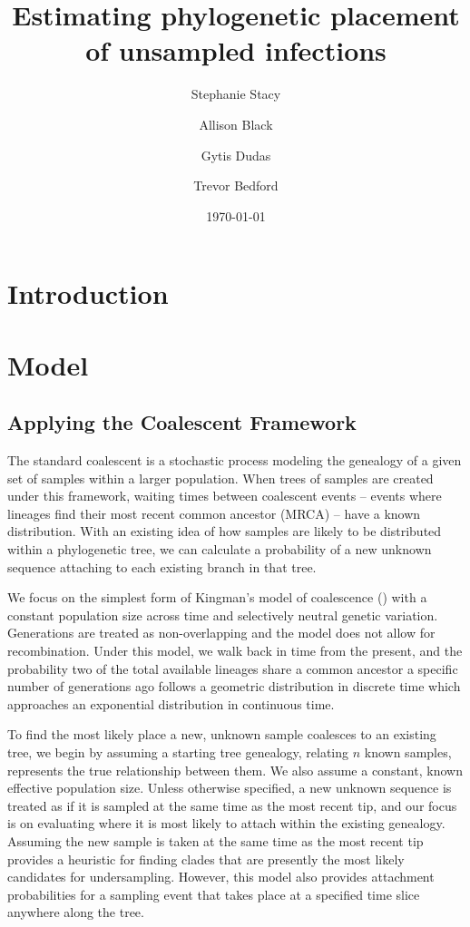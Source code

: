 \documentclass[11pt,oneside,letterpaper]{article}
\title{\vspace{1.0cm} \LARGE \bf Estimating phylogenetic placement of unsampled infections}
\author[1]{Stephanie Stacy}
\author[1,2]{Allison Black}
\author[1]{Gytis Dudas}
\author[1]{Trevor Bedford}
\affil[1]{Vaccine and Infectious Disease Division, Fred Hutchinson Cancer Research Center, Seattle, WA, USA}
\affil[2]{Department of Epidemiology, University of Washington, Seattle, WA, USA}
\date{\today}
\newcommand\tab[1][1cm]{\hspace*{#1}}
\begin{document}
\maketitle

\begin{abstract}


\end{abstract}

\pagebreak

\section*{Introduction}


\section*{Model}
\subsection*{Applying the Coalescent Framework}
\tab The standard coalescent is a stochastic process modeling the genealogy of a given set of samples within a larger population. When trees of samples are created under this framework, waiting times between coalescent events -- events where lineages find their most recent common ancestor (MRCA) -- have a known distribution. With an existing idea of how samples are likely to be distributed within a phylogenetic tree, we can calculate a probability of a new unknown sequence attaching to each existing branch in that tree. 

\tab We focus on the simplest form of Kingman's model of coalescence () with a constant population size across time and selectively neutral genetic variation. Generations are treated as non-overlapping and the model does not allow for recombination. Under this model, we walk back in time from the present, and the probability two of the total available lineages share a common ancestor a specific number of generations ago follows a geometric distribution in discrete time which approaches an exponential distribution in continuous time. 

\tab To find the most likely place a new, unknown sample coalesces to an existing tree, we begin by assuming a starting tree genealogy, relating $n$ known samples, represents the true relationship between them. We also assume a constant, known effective population size. Unless otherwise specified, a new unknown sequence is treated as if it is sampled at the same time as the most recent tip, and our focus is on evaluating where it is most likely to attach within the existing genealogy.  Assuming the new sample is taken at the same time as the most recent tip provides a heuristic for finding clades that are presently the most likely candidates for undersampling. However, this model also provides attachment probabilities for a sampling event that takes place at a specified time slice anywhere along the tree. 
\end{document}
